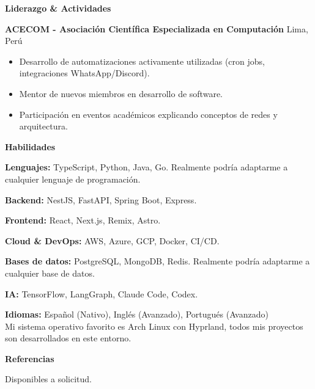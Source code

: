 \documentclass[11pt]{article}
\begin{document}
\begin{center}
\textbf{Liderazgo \& Actividades}
\end{center}

\textbf{ACECOM - Asociación Científica Especializada en Computación} \hfill Lima, Perú

\begin{itemize}[noitemsep]
\item Desarrollo de automatizaciones activamente utilizadas (cron jobs, integraciones WhatsApp/Discord).
\item Mentor de nuevos miembros en desarrollo de software.
\item Participación en eventos académicos explicando conceptos de redes y arquitectura.
\end{itemize}

\vspace{10pt}

\begin{center}
\textbf{Habilidades}
\end{center}

\textbf{Lenguajes:} TypeScript, Python, Java, Go. Realmente podría adaptarme a cualquier lenguaje de programación.

\textbf{Backend:} NestJS, FastAPI, Spring Boot, Express.

\textbf{Frontend:} React, Next.js, Remix, Astro.

\textbf{Cloud \& DevOps:} AWS, Azure, GCP, Docker, CI/CD.

\textbf{Bases de datos:} PostgreSQL, MongoDB, Redis. Realmente podría adaptarme a cualquier base de datos.

\textbf{IA:} TensorFlow, LangGraph, Claude Code, Codex.

\textbf{Idiomas:} Español (Nativo), Inglés (Avanzado), Portugués (Avanzado) \\

Mi sistema operativo favorito es Arch Linux con Hyprland, todos mis proyectos son desarrollados en este entorno.

\vspace{10pt}

\begin{center}
\textbf{Referencias}
\end{center}

Disponibles a solicitud.
\end{document}
